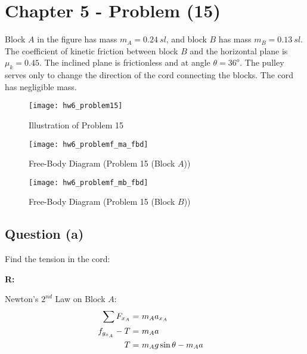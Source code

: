 \section{Chapter 5 - Problem (15)}
	Block $A$ in the figure has mass $m_{A} = 0.24 \ sl$, and block $B$ has mass $m_{B} = 0.13 \ sl$. The coefficient of kinetic friction between block $B$ and the horizontal plane is $\mu_{k} = 0.45$. The inclined plane is frictionless and at angle $\theta = 36^{o}$. The pulley serves only to change the direction of the cord connecting the blocks. The cord has negligible mass.

	\begin{figure}[H]
		\begin{center}
			\texttt{[image: hw6\_problem15]}
			\caption{Illustration of Problem 15}
			\label{fig:hw6_problem15}
		\end{center}
	\end{figure}

	\begin{figure}[H]
		\begin{center}
			\texttt{[image: hw6\_problemf\_ma\_fbd]}
			\caption{Free-Body Diagram (Problem 15 (Block $A$))}
			\label{fig:hw6_problemf_ma_fbd}
		\end{center}
	\end{figure}

	\begin{figure}[H]
		\begin{center}
			\texttt{[image: hw6\_problemf\_mb\_fbd]}
			\caption{Free-Body Diagram (Problem 15 (Block $B$))}
			\label{fig:hw6_problemf_mb_fbd}
		\end{center}
	\end{figure}

	\subsection{Question (a)}

		Find the tension in the cord:

		\textbf{R:} \newline

		Newton's $2^{nd}$ Law on Block $A$:
		\begin{align}
			\sum F_{x_{A}} = \ &m_{A}a_{x_{A}}& \notag \\
			f_{g_{x_{A}}} - T = \ &m_{A}a& \notag \\
			T = \ &m_{A}g \sin \theta - m_{A}a& \notag
		\end{align}

